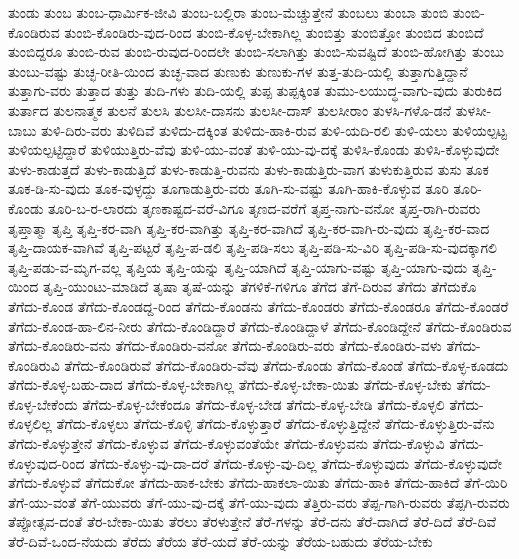 {ತುಂಡು
ತುಂಬ
ತುಂಬ-ಧಾರ್ಮಿಕ-ಜೀವಿ
ತುಂಬ-ಬಲ್ಲಿರಾ
ತುಂಬ-ಮೆಚ್ಚುತ್ತೇನೆ
ತುಂಬಲು
ತುಂಬಾ
ತುಂಬಿ
ತುಂಬಿ-ಕೊಂಡಿರುವ
ತುಂಬಿ-ಕೊಂಡಿರು-ವುದ-ರಿಂದ
ತುಂಬಿ-ಕೊಳ್ಳ-ಬೇಕಾಗಿಲ್ಲ
ತುಂಬಿತ್ತು
ತುಂಬಿತ್ತೋ
ತುಂಬಿದ
ತುಂಬಿದೆ
ತುಂಬಿದ್ದರೂ
ತುಂಬಿ-ರುವ
ತುಂಬಿ-ರುವುದ-ರಿಂದಲೇ
ತುಂಬಿ-ಸಲಾಗಿತ್ತು
ತುಂಬಿ-ಸುವಷ್ಟಿದೆ
ತುಂಬಿ-ಹೋಗಿತ್ತು
ತುಂಬು
ತುಂಬು-ವಷ್ಟು
ತುಚ್ಛ-ರೀತಿ-ಯಿಂದ
ತುಚ್ಛ-ವಾದ
ತುಣುಕು
ತುಣುಕು-ಗಳ
ತುತ್ತ-ತುದಿ-ಯಲ್ಲಿ
ತುತ್ತಾಗುತ್ತಿದ್ದಾನೆ
ತುತ್ತಾಗು-ವರು
ತುತ್ತಾದ
ತುತ್ತು
ತುದಿ-ಗಳು
ತುದಿ-ಯಲ್ಲಿ
ತುಪ್ಪ
ತುಪ್ಪಕ್ಕಿಂತ
ತುಮು-ಲಯುದ್ಧ-ವಾಗು-ವುದು
ತುರುಕಿದ
ತುರ್ತಾದ
ತುಲನಾತ್ಮಕ
ತುಲನೆ
ತುಲಸಿ
ತುಲಸೀ-ದಾಸನು
ತುಲಸೀ-ದಾಸ್
ತುಲಸೀರಾಂ
ತುಳಸಿ-ಗಳೊ-ಡನೆ
ತುಳಸೀ-ಬಾಬು
ತುಳಿ-ದಿರು-ವರು
ತುಳಿದಿವೆ
ತುಳಿದು-ದಕ್ಕಿಂತ
ತುಳಿದು-ಹಾಕಿ-ರುವ
ತುಳಿ-ಯದಿ-ರಲಿ
ತುಳಿ-ಯಲು
ತುಳಿಯಲ್ಪಟ್ಟ
ತುಳಿಯಲ್ಪಟ್ಟಿದ್ದಾರೆ
ತುಳಿಯುತ್ತಿರು-ವೆವು
ತುಳಿ-ಯು-ವಂತೆ
ತುಳಿ-ಯು-ವು-ದಕ್ಕೆ
ತುಳಿಸಿ-ಕೊಂಡು
ತುಳಿಸಿ-ಕೊಳ್ಳುವುದೇ
ತುಳು-ಕಾಡುತ್ತದೆ
ತುಳು-ಕಾಡುತ್ತಿದೆ
ತುಳು-ಕಾಡುತ್ತಿ-ರುವನು
ತುಳು-ಕಾಡುತ್ತಿರು-ವಾಗ
ತುಳುಕುತ್ತಿರುವ
ತುಸು
ತೂಕ
ತೂಕ-ಡಿ-ಸು-ವುದು
ತೂಕ-ವುಳ್ಳದ್ದು
ತೂಗಾಡುತ್ತಿರು-ವರು
ತೂಗಿ-ಸು-ವಷ್ಟು
ತೂಗಿ-ಹಾಕಿ-ಕೊಳ್ಳುವ
ತೂರಿ
ತೂರಿ-ಕೊಂಡು
ತೂರಿ-ಬ-ರ-ಲಾರದು
ತೃಣಕಾಷ್ಟದ-ವರೆ-ವಿಗೂ
ತೃಣದ-ವರೆಗೆ
ತೃಪ್ತ-ನಾಗು-ವನೋ
ತೃಪ್ತ-ರಾಗಿ-ರುವರು
ತೃಪ್ತಾತ್ಮಾ
ತೃಪ್ತಿ
ತೃಪ್ತಿ-ಕರ-ವಾಗಿ
ತೃಪ್ತಿ-ಕರ-ವಾಗಿತ್ತು
ತೃಪ್ತಿ-ಕರ-ವಾಗಿದೆ
ತೃಪ್ತಿ-ಕರ-ವಾಗಿ-ರು-ವುದು
ತೃಪ್ತಿ-ಕರ-ವಾದ
ತೃಪ್ತಿ-ದಾಯಕ-ವಾಗಿವೆ
ತೃಪ್ತಿ-ಪಟ್ಟರೆ
ತೃಪ್ತಿ-ಪ-ಡಲಿ
ತೃಪ್ತಿ-ಪಡಿ-ಸಲು
ತೃಪ್ತಿ-ಪಡಿ-ಸು-ವಿರಿ
ತೃಪ್ತಿ-ಪಡಿ-ಸು-ವುದಕ್ಕಾಗಲಿ
ತೃಪ್ತಿ-ಪಡು-ವ-ಮೃಗ-ವಲ್ಲ
ತೃಪ್ತಿಯ
ತೃಪ್ತಿ-ಯನ್ನು
ತೃಪ್ತಿ-ಯಾಗಿದೆ
ತೃಪ್ತಿ-ಯಾಗು-ವಷ್ಟು
ತೃಪ್ತಿ-ಯಾಗು-ವುದು
ತೃಪ್ತಿ-ಯಿಂದ
ತೃಪ್ತಿ-ಯುಂಟು-ಮಾಡಿದೆ
ತೃಷಾ
ತೃಷೆ-ಯನ್ನು
ತೆಗಳಿಕೆ-ಗಳಿಗೂ
ತೆಗೆದ
ತೆಗೆ-ದಿರುವ
ತೆಗೆದು
ತೆಗೆದುಕೊ
ತೆಗೆದು-ಕೊಂಡ
ತೆಗೆದು-ಕೊಂಡದ್ದ-ರಿಂದ
ತೆಗೆದು-ಕೊಂಡನು
ತೆಗೆದು-ಕೊಂಡರು
ತೆಗೆದು-ಕೊಂಡರೂ
ತೆಗೆದು-ಕೊಂಡರೆ
ತೆಗೆದು-ಕೊಂಡ-ಹಾ-ಲಿನ-ನೀರು
ತೆಗೆದು-ಕೊಂಡಿದ್ದಾರೆ
ತೆಗೆದು-ಕೊಂಡಿದ್ದಾಳೆ
ತೆಗೆದು-ಕೊಂಡಿದ್ದೇನೆ
ತೆಗೆದು-ಕೊಂಡಿರುವ
ತೆಗೆದು-ಕೊಂಡಿರು-ವನು
ತೆಗೆದು-ಕೊಂಡಿರು-ವನೋ
ತೆಗೆದು-ಕೊಂಡಿರು-ವರು
ತೆಗೆದು-ಕೊಂಡಿರು-ವಳು
ತೆಗೆದು-ಕೊಂಡಿರುವಿ
ತೆಗೆದು-ಕೊಂಡಿರುವೆ
ತೆಗೆದು-ಕೊಂಡಿರು-ವೆವು
ತೆಗೆದು-ಕೊಂಡು
ತೆಗೆದು-ಕೊಂಡೆ
ತೆಗೆದು-ಕೊಳ್ಳ-ಕೂಡದು
ತೆಗೆದು-ಕೊಳ್ಳ-ಬಹು-ದಾದ
ತೆಗೆದು-ಕೊಳ್ಳ-ಬೇಕಾಗಿಲ್ಲ
ತೆಗೆದು-ಕೊಳ್ಳ-ಬೇಕಾ-ಯಿತು
ತೆಗೆದು-ಕೊಳ್ಳ-ಬೇಕು
ತೆಗೆದು-ಕೊಳ್ಳ-ಬೇಕೆಂದು
ತೆಗೆದು-ಕೊಳ್ಳ-ಬೇಕೆಂದೂ
ತೆಗೆದು-ಕೊಳ್ಳ-ಬೇಡ
ತೆಗೆದು-ಕೊಳ್ಳ-ಬೇಡಿ
ತೆಗೆದು-ಕೊಳ್ಳಲಿ
ತೆಗೆದು-ಕೊಳ್ಳಲಿಲ್ಲ
ತೆಗೆದು-ಕೊಳ್ಳಲು
ತೆಗೆದು-ಕೊಳ್ಳಿ
ತೆಗೆದು-ಕೊಳ್ಳುತ್ತಾರೆ
ತೆಗೆದು-ಕೊಳ್ಳುತ್ತಿದ್ದೇನೆ
ತೆಗೆದು-ಕೊಳ್ಳುತ್ತಿರು-ವೆನು
ತೆಗೆದು-ಕೊಳ್ಳುತ್ತೇನೆ
ತೆಗೆದು-ಕೊಳ್ಳುವ
ತೆಗೆದು-ಕೊಳ್ಳುವಂತೆಯೇ
ತೆಗೆದು-ಕೊಳ್ಳುವನು
ತೆಗೆದು-ಕೊಳ್ಳುವಿ
ತೆಗೆದು-ಕೊಳ್ಳುವುದ-ರಿಂದ
ತೆಗೆದು-ಕೊಳ್ಳು-ವು-ದಾ-ದರೆ
ತೆಗೆದು-ಕೊಳ್ಳು-ವು-ದಿಲ್ಲ
ತೆಗೆದು-ಕೊಳ್ಳುವುದು
ತೆಗೆದು-ಕೊಳ್ಳುವುದೇ
ತೆಗೆದು-ಕೊಳ್ಳುವೆ
ತೆಗೆದುಕೋ
ತೆಗೆದು-ಹಾಕ-ಬೇಕು
ತೆಗೆದು-ಹಾಕಲಾ-ಯಿತು
ತೆಗೆದು-ಹಾಕಿ
ತೆಗೆದು-ಹಾಕಿದೆ
ತೆಗೆ-ಯಿರಿ
ತೆಗೆ-ಯು-ವಂತೆ
ತೆಗೆ-ಯುವರು
ತೆಗೆ-ಯು-ವು-ದಕ್ಕೆ
ತೆಗೆ-ಯು-ವುದು
ತೆತ್ತಿರು-ವರು
ತೆಪ್ಪ-ಗಾಗಿ-ರುವರು
ತೆಪ್ಪಗಿ-ರುವರು
ತೆಪ್ಪೋತ್ಸವ-ದಂತೆ
ತೆರ-ಬೇಕಾ-ಯಿತು
ತೆರಲು
ತೆರಳುತ್ತೇನೆ
ತೆರೆ-ಗಳನ್ನು
ತೆರೆ-ದನು
ತೆರೆ-ದಾಗಿದೆ
ತೆರೆ-ದಿದೆ
ತೆರೆ-ದಿವೆ
ತೆರೆ-ದಿವೆ-ಒಂದ-ನೆಯದು
ತೆರೆದು
ತೆರೆಯ
ತೆರೆ-ಯದೆ
ತೆರೆ-ಯನ್ನು
ತೆರೆಯ-ಬಹುದು
ತೆರೆಯ-ಬೇಕು
}

